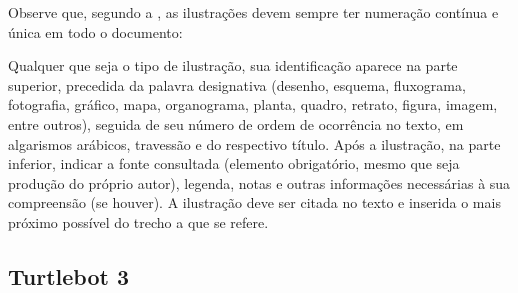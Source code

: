 Observe que, segundo a , as ilustrações devem sempre ter numeração contínua e única em todo o documento:

\begin{citacao}
   Qualquer que seja o tipo de ilustração, sua identificação aparece na parte superior, precedida da palavra designativa (desenho, esquema, fluxograma, fotografia, gráfico, mapa, organograma, planta, quadro, retrato, figura, imagem, entre outros), seguida de seu número de ordem de ocorrência no texto, em algarismos arábicos, travessão e do respectivo título. Após a ilustração, na parte inferior, indicar a fonte consultada (elemento obrigatório, mesmo que seja produção do próprio autor), legenda, notas e outras informações necessárias à sua compreensão (se houver). A ilustração deve ser citada no texto e inserida o mais próximo possível do trecho a que se refere. \cite[seções 5.8]{NBR14724:2011}
\end{citacao}


\subsection{Turtlebot 3}
\label{ss:turtlebot3}



